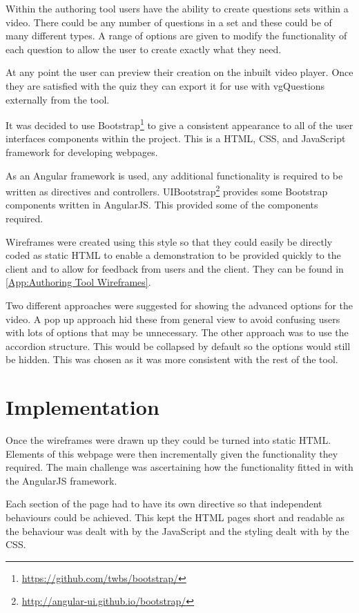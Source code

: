 Within the authoring tool users have the ability to create questions sets within a video. There could be any number of questions in a set and these could be of many different types. A range of options are given to modify the functionality of each question to allow the user to create exactly what they need.

At any point the user can preview their creation on the inbuilt video player. Once they are satisfied with the quiz they can export it for use with \gls{vgQuestions} externally from the tool.

It was decided to use Bootstrap\footnote{\url{https://github.com/twbs/bootstrap/}} to give a consistent appearance to all of the user interfaces components within the project. This is a HTML, \gls{CSS}, and JavaScript framework for developing webpages.

As an Angular framework is used, any additional functionality is required to be written as directives and controllers. UIBootstrap\footnote{\url{http://angular-ui.github.io/bootstrap/}} provides some Bootstrap components written in \gls{AngularJS}. This provided some of the components required. 

Wireframes were created using this style so that they could easily be directly coded as static HTML to enable a demonstration to be provided quickly to the client and to allow for feedback from users and the client. They can be found in \cref{App:Authoring Tool Wireframes}.

Two different approaches were suggested for showing the advanced options for the video. A pop up approach hid these from general view to avoid confusing users with lots of options that may be unnecessary. The other approach was to use the accordion structure. This would be collapsed by default so the options would still be hidden. This was chosen as it was more consistent with the rest of the tool. 

\section{Implementation}
\label{Section:Authoring_Implementation}
Once the wireframes were drawn up they could be turned into static HTML. Elements of this webpage were then incrementally given the functionality they required. The main challenge was ascertaining how the functionality fitted in with the \gls{AngularJS} framework. 

Each section of the page had to have its own directive so that independent behaviours could be achieved. This kept the HTML pages short and readable as the behaviour was dealt with by the JavaScript and the styling dealt with by the \gls{CSS}.

